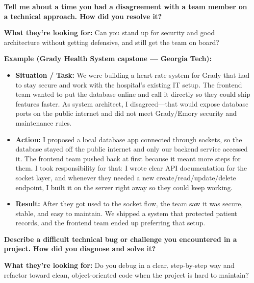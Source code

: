 



\question[0]
\textbf{Tell me about a time you had a disagreement with a team member on a technical approach. How did you resolve it?}

\textbf{What they're looking for:} Can you stand up for security and good architecture without getting defensive, and still get the team on board?

\textbf{Example (Grady Health System capstone --- Georgia Tech):}
\begin{itemize}
  \item \textbf{Situation / Task:} We were building a heart-rate system for Grady that had to stay secure and work with the hospital's existing IT setup. The frontend team wanted to put the database online and call it directly so they could ship features faster. As system architect, I disagreed---that would expose database ports on the public internet and did not meet Grady/Emory security and maintenance rules.
  \item \textbf{Action:} I proposed a local database app connected through sockets, so the database stayed off the public internet and only our backend service accessed it. The frontend team pushed back at first because it meant more steps for them. I took responsibility for that: I wrote clear API documentation for the socket layer, and whenever they needed a new create/read/update/delete endpoint, I built it on the server right away so they could keep working.
  \item \textbf{Result:} After they got used to the socket flow, the team saw it was secure, stable, and easy to maintain. We shipped a system that protected patient records, and the frontend team ended up preferring that setup.
\end{itemize}

\question[0]
\textbf{Describe a difficult technical bug or challenge you encountered in a project. How did you diagnose and solve it?}
 
\textbf{What they're looking for:} Do you debug in a clear, step-by-step way and refactor toward clean, object-oriented code when the project is hard to maintain?

